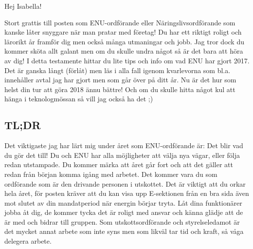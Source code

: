 \documentclass[10pt]{article}
\begin{document}
\heading{\doctitle}

Hej Isabella!

Stort grattis till posten som ENU-ordförande eller Näringslivsordförande som kanske låter snyggare när man pratar med företag! Du har ett riktigt roligt och lärorikt år framför dig men också många utmaningar och jobb. Jag tror dock du kommer sköta allt galant men om du skulle undra något så är det bara att höra av dig! I detta testamente hittar du lite tips och info om vad ENU har gjort 2017. Det är ganska långt (förlåt) men läs i alla fall igenom kvarlevorna som bl.a. innehåller avtal jag har gjort men som går över på ditt år. Nu är det hur som helst din tur att göra 2018 ännu bättre! Och om du skulle hitta något kul att hänga i teknologmössan så vill jag också ha det ;)

\subsection*{TL;DR}
Det viktigaste jag har lärt mig under året som ENU-ordförande är: Det blir vad du gör det till! Du och
ENU har alla möjligheter att välja nya vägar, eller följa redan utstampade. Du kommer märka att året
går fort och att det gäller att redan från början komma igång med arbetet. Det kommer vara du som
ordförande som är den drivande personen i utskottet. Det är viktigt att du orkar hela året, för posten
kräver att du kan visa upp E-sektionen från en bra sida även mot slutet av din mandatperiod när
energin börjar tryta. Låt dina funktionärer jobba åt dig, de kommer tycka det är roligt med ansvar och
känna glädje att de är med och bidrar till gruppen. Som utskottsordförande och styrelseledamot är
det mycket annat arbete som inte syns men som likväl tar tid och kraft, så våga delegera arbete.
\end{document}
